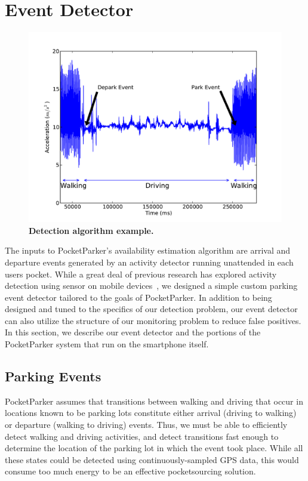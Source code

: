 \section{Event Detector}
\label{sec-detector}

\begin{figure}
\centering
\includegraphics[width=\columnwidth]{./figures/Detection.pdf}

\caption{\textbf{Detection algorithm example.} }

\label{fig-camera}
\end{figure}

The inputs to PocketParker's availability estimation algorithm are arrival
and departure events generated by an activity detector running unattended in
each users pocket. While a great deal of previous research has explored
activity detection using sensor on mobile devices~\cite{FIXME}, we designed a
simple custom parking event detector tailored to the goals of PocketParker.
In addition to being designed and tuned to the specifics of our detection
problem, our event detector can also utilize the structure of our monitoring
problem to reduce false positives. In this section, we describe our event
detector and the portions of the PocketParker system that run on the
smartphone itself.

\subsection{Parking Events}
\label{subsec-goals}

PocketParker assumes that transitions between walking and driving that occur
in locations known to be parking lots constitute either arrival (driving to
walking) or departure (walking to driving) events. Thus, we must be able to
efficiently detect walking and driving activities, and detect transitions
fast enough to determine the location of the parking lot in which the event
took place. While all these states could be detected using
continuously-sampled GPS data, this would consume too much energy to be an
effective pocketsourcing solution.

